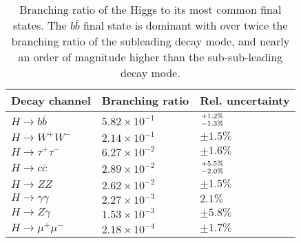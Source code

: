\begin{table}[tbh]
\begin{center}
\caption{
    Branching ratio of the Higgs to its most common final states.
    The $b \bar{b}$ final state is dominant with over twice the branching ratio of the subleading decay mode,
        and nearly an order of magnitude higher than the sub-sub-leading decay mode\cite{particlephysicsreview2021}.
}
\label{tab:higgsbranching}
\begin{tabular}{|l|l|l|}
    \toprule
    Decay channel & Branching ratio & Rel. uncertainty  \\
    \midrule
    $ H \to b \bar{b}        $    & $5.82 \times 10^{-1} $    & $ +1.2\% \atop -1.3\% $ \\
    $ H \to W^+ W^-          $    & $2.14 \times 10^{-1} $    & $\pm 1.5\%        $   \\
    $ H \to \tau^+ \tau^-    $    & $6.27 \times 10^{-2} $    & $\pm 1.6\%        $   \\
    $ H \to c \bar{c}        $    & $2.89 \times 10^{-2} $    & $ +5.5\% \atop -2.0\% $ \\
    $ H \to ZZ               $    & $2.62 \times 10^{-2} $    & $\pm 1.5\%        $   \\
    $ H \to \gamma \gamma    $    & $2.27 \times 10^{-3} $    & $    2.1\%        $   \\
    $ H \to Z \gamma         $    & $1.53 \times 10^{-3} $    & $\pm 5.8\%        $  \\
    $ H \to \mu^+ \mu^-      $    & $2.18 \times 10^{-4} $    & $\pm 1.7\%        $  \\
    \bottomrule
\end{tabular}
\end{center}
\end{table}
